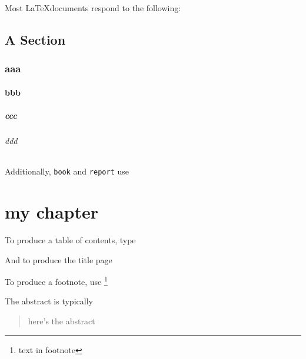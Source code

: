 Most \LaTeX documents respond to the following:

\section{A Section}
\subsection{aaa}
\subsubsection{bbb}
\paragraph{ccc}
\subparagraph{ddd}

Additionally, \texttt{book} and \texttt{report} use

\chapter{my chapter}

To produce a table of contents, type

\tableofcontents

And to produce the title page

\maketitle

To produce a footnote, use
\footnote{text in footnote}

The abstract is typically
\begin{abstract}
here's the abstract
\end{abstract}
